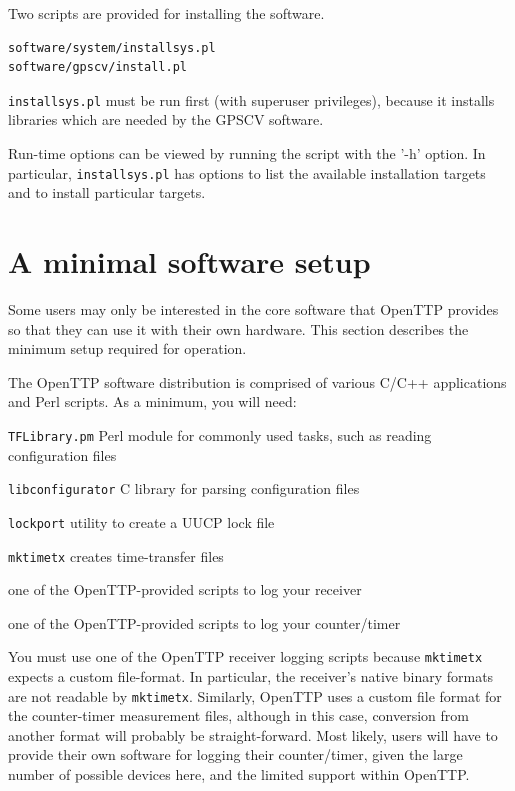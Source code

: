 \documentclass[11pt,a4paper,openany,oneside]{book}
\newcommand{\cc}[1]{{\texttt{#1}}}
\newenvironment{description*}%
  {\setlength{\parskip}{0pt}%
	 \begin{description}%
		\setlength{\topsep}{-12pt}%
		\setlength{\itemindent}{-12pt}%
    \setlength{\itemsep}{0pt}%
		\setlength{\itemsep}{0pt}}%
  {\end{description}}
\begin{document}
Two scripts are provided for installing the software.
\begin{lstlisting}
software/system/installsys.pl
software/gpscv/install.pl
\end{lstlisting}

\cc{installsys.pl} must be run first (with superuser privileges), because it installs libraries which are needed by the GPSCV software.

Run-time options can be viewed by running the script with the '-h' option. In particular, \cc{installsys.pl}
has options to list the available installation targets and to install particular targets.

\section{A minimal software setup}

Some users may only be interested in the core software that OpenTTP provides so that they can use
it with their own hardware. This section describes the minimum setup required for operation.

The OpenTTP software distribution is comprised of various C/C++ applications and Perl scripts.
As a minimum, you will need:
\begin{description*}
	\item \cc{TFLibrary.pm} Perl module for commonly used tasks, such as reading configuration files
	\item \cc{libconfigurator} C library for parsing configuration files
	\item \cc{lockport} utility to create a UUCP lock file
	\item \cc{mktimetx} creates time-transfer files
	\item one of the OpenTTP-provided scripts to log your receiver
	\item one of the OpenTTP-provided scripts to log your counter/timer
\end{description*}

You must use one of the OpenTTP receiver logging scripts because \cc{mktimetx} expects a custom file-format. In particular, the
receiver's native binary formats are not readable by \cc{mktimetx}. Similarly, OpenTTP uses a custom file
format for the counter-timer measurement files, although in this case, conversion from another format
will probably be straight-forward. Most likely, users will have to provide their own software for
logging their counter/timer, given the large number of possible devices here, and the limited
support within OpenTTP.
\end{document}
